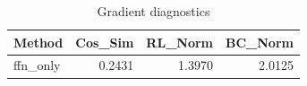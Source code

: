 \begin{table}[htbp]
\centering
\caption{Gradient diagnostics}
\label{tab:grad-diag}
\begin{tabular}{lrrr}
\toprule
\textbf{Method} & \textbf{Cos\_Sim} & \textbf{RL\_Norm} & \textbf{BC\_Norm} \\
\midrule
ffn\_only & 0.2431 & 1.3970 & 2.0125 \\
\bottomrule
\end{tabular}
\end{table}